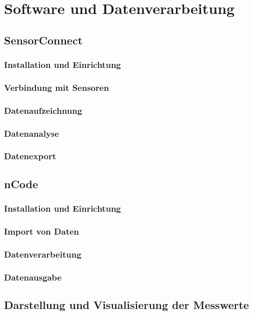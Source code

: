 \chapter{Software und Datenverarbeitung}

\section{SensorConnect}
\subsection{Installation und Einrichtung}
\subsection{Verbindung mit Sensoren}
\subsection{Datenaufzeichnung}
\subsection{Datenanalyse}
\subsection{Datenexport}
\section{nCode}
\subsection{Installation und Einrichtung}
\subsection{Import von Daten}
\subsection{Datenverarbeitung}
\subsection{Datenausgabe}
\section{Darstellung und Visualisierung der Messwerte}

